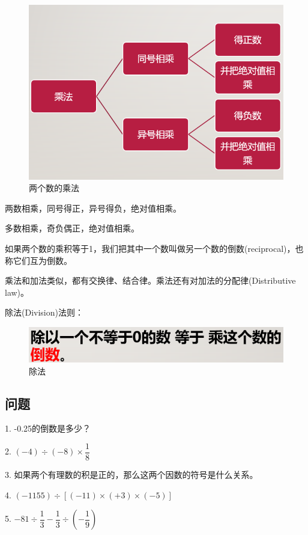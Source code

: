 \documentclass[UTF8,12pt]{ctexart}
\begin{document}
\begin{figure}[htb]
\centering
\includegraphics[width = .75\textwidth]{multiplication.png}
\caption{两个数的乘法}
\label{fig:multiplication}
\end{figure}

两数相乘，同号得正，异号得负，绝对值相乘。

多数相乘，奇负偶正，绝对值相乘。

如果两个数的乘积等于1，我们把其中一个数叫做另一个数的倒数(reciprocal)，也称它们互为倒数。

乘法和加法类似，都有交换律、结合律。乘法还有对加法的分配律(Distributive law)。

\newpage
除法(Division)法则：
\begin{figure}[htb]
\centering
\includegraphics[width = .5\textwidth]{division.png}
\caption{除法}
\label{fig:division}
\end{figure}

\subsection{问题}
1. \quad -0.25的倒数是多少？

2. \quad $ (-4)\div(-8)\times\dfrac{1}{8} $

3. \quad 如果两个有理数的积是正的，那么这两个因数的符号是什么关系。

4. \quad $ (-1155) \div [(-11) \times (+3) \times (-5)] $

5. \quad $ -81 \div \dfrac{1}{3} - \dfrac{1}{3} \div (-\dfrac{1}{9}) $
\end{document}
